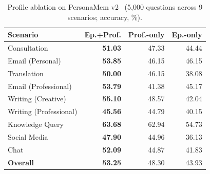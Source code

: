 \begin{table}[t]
    \centering
    \small
    \setlength{\tabcolsep}{3pt}
    \renewcommand{\arraystretch}{1.0}
    \begin{tabular}{l r r r}
    \toprule
    \textbf{Scenario} & \textbf{Ep.+Prof.} & \textbf{Prof.-only} & \textbf{Ep.-only} \\
    \midrule
Consultation        & \textbf{51.03} & 47.33 & 44.44 \\
Email (Personal)    & \textbf{53.85} & 46.15 & 46.15 \\
Translation         & \textbf{50.00} & 46.15 & 38.08 \\
Email (Professional) & \textbf{53.79} & 41.38 & 45.17 \\
Writing (Creative)    & \textbf{55.10} & 48.57 & 42.04 \\
Writing (Professional) & \textbf{45.56} & 44.79 & 40.15 \\
Knowledge Query     & \textbf{63.68} & 62.94 & 54.73 \\
Social Media        & \textbf{47.90} & 44.96 & 36.13 \\
Chat                & \textbf{52.09} & 44.87 & 41.83 \\
\midrule
\textbf{Overall}    & \textbf{53.25} & 48.30 & 43.93 \\
    \bottomrule
    \end{tabular}
    \caption{Profile ablation on PersonaMem v2~\cite{jiang2025personamem} (5{,}000 questions across 9 scenarios; accuracy, \%).}
    \vspace{-2mm}
    \label{tab:profile_effect}
    \end{table}